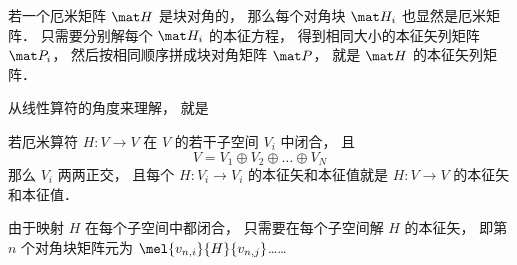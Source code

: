 

\begin{theorem}{}
若一个厄米矩阵 $\mat H$ 是块对角的， 那么每个对角块 $\mat H_i$ 也显然是厄米矩阵． 只需要分别解每个 $\mat H_i$ 的本征方程， 得到相同大小的本征矢列矩阵 $\mat P_i$， 然后按相同顺序拼成块对角矩阵 $\mat P$， 就是 $\mat H$ 的本征矢列矩阵．
\end{theorem}

从线性算符的角度来理解， 就是
\begin{theorem}{}
若厄米算符 $H:V\to V$ 在 $V$ 的若干子空间 $V_i$ 中闭合， 且
\begin{equation}
V = V_1\oplus V_2\oplus \dots \oplus V_N
\end{equation}
那么 $V_i$ 两两正交， 且每个 $H:V_i\to V_i$ 的本征矢和本征值就是 $H:V\to V$ 的本征矢和本征值．
\end{theorem}


由于映射 $H$ 在每个子空间中都闭合， 只需要在每个子空间解 $H$ 的本征矢， 即第 $n$ 个对角块矩阵元为 $\mel{v_{n,i}}{H}{v_{n,j}}$……
